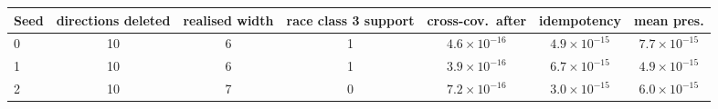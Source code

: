 \begin{tabular}{@{}lcccccc@{}}
\toprule
Seed & directions deleted & realised width & race class 3 support & cross-cov.\ after & idempotency & mean pres. \\
\midrule
0 & 10 & 6 & 1 & $4.6\times10^{-16}$ & $4.9\times10^{-15}$ & $7.7\times10^{-15}$ \\
1 & 10 & 6 & 1 & $3.9\times10^{-16}$ & $6.7\times10^{-15}$ & $4.9\times10^{-15}$ \\
2 & 10 & 7 & 0 & $7.2\times10^{-16}$ & $3.0\times10^{-15}$ & $6.0\times10^{-15}$ \\
\bottomrule
\end{tabular}
